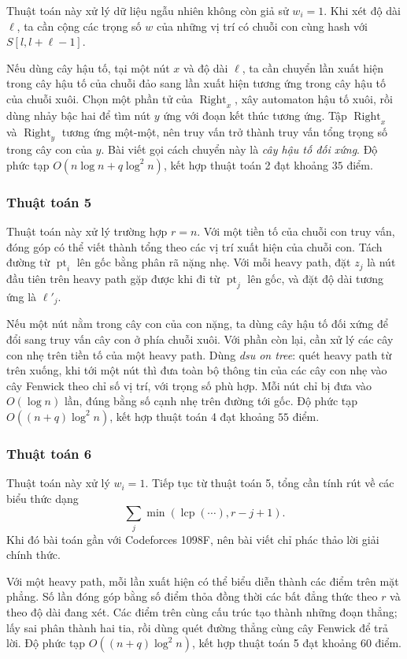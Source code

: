 \documentclass[11pt]{article}
\begin{document}
Thuật toán này xử lý dữ liệu ngẫu nhiên không còn giả sử $w_i=1$. Khi xét độ dài
$\ell$, ta cần cộng các trọng số $w$ của những vị trí có chuỗi con cùng hash với
$S[l,l+\ell-1]$.

Nếu dùng cây hậu tố, tại một nút $x$ và độ dài $\ell$, ta cần chuyển lần xuất
hiện trong cây hậu tố của chuỗi đảo sang lần xuất hiện tương ứng trong cây hậu
tố của chuỗi xuôi. Chọn một phần tử của $\operatorname{Right}_x$, xây automaton
hậu tố xuôi, rồi dùng nhảy bậc hai để tìm nút $y$ ứng với đoạn kết thúc tương
ứng. Tập $\operatorname{Right}_x$ và $\operatorname{Right}_y$ tương ứng một-một,
nên truy vấn trở thành truy vấn tổng trọng số trong cây con của $y$. Bài viết
gọi cách chuyển này là \emph{cây hậu tố đối xứng}. Độ phức tạp
$O(n\log n+q\log^2 n)$, kết hợp thuật toán 2 đạt khoảng $35$ điểm.

\subsubsection{Thuật toán 5}

Thuật toán này xử lý trường hợp $r=n$. Với một tiền tố của chuỗi con truy vấn,
đóng góp có thể viết thành tổng theo các vị trí xuất hiện của chuỗi con. Tách
đường từ $\operatorname{pt}_i$ lên gốc bằng phân rã nặng nhẹ. Với mỗi heavy path,
đặt $z_j$ là nút đầu tiên trên heavy path gặp được khi đi từ $\operatorname{pt}_j$
lên gốc, và đặt độ dài tương ứng là $\ell'_j$.

Nếu một nút nằm trong cây con của con nặng, ta dùng cây hậu tố đối xứng để đổi
sang truy vấn cây con ở phía chuỗi xuôi. Với phần còn lại, cần xử lý các cây con
nhẹ trên tiền tố của một heavy path. Dùng \emph{dsu on tree}: quét heavy path từ
trên xuống, khi tới một nút thì đưa toàn bộ thông tin của các cây con nhẹ vào
cây Fenwick theo chỉ số vị trí, với trọng số phù hợp. Mỗi nút chỉ bị đưa vào
$O(\log n)$ lần, đúng bằng số cạnh nhẹ trên đường tới gốc. Độ phức tạp
$O((n+q)\log^2 n)$, kết hợp thuật toán 4 đạt khoảng $55$ điểm.

\subsubsection{Thuật toán 6}

Thuật toán này xử lý $w_i=1$. Tiếp tục từ thuật toán 5, tổng cần tính rút về các
biểu thức dạng
\[
  \sum_j \min(\operatorname{lcp}(\cdots), r-j+1).
\]
Khi đó bài toán gần với Codeforces 1098F, nên bài viết chỉ phác thảo lời giải
chính thức.

Với một heavy path, mỗi lần xuất hiện có thể biểu diễn thành các điểm trên mặt
phẳng. Số lần đóng góp bằng số điểm thỏa đồng thời các bất đẳng thức theo $r$ và
theo độ dài đang xét. Các điểm trên cùng cấu trúc tạo thành những đoạn thẳng;
lấy sai phân thành hai tia, rồi dùng quét đường thẳng cùng cây Fenwick để trả
lời. Độ phức tạp $O((n+q)\log^2 n)$, kết hợp thuật toán 5 đạt khoảng $60$ điểm.
\end{document}
